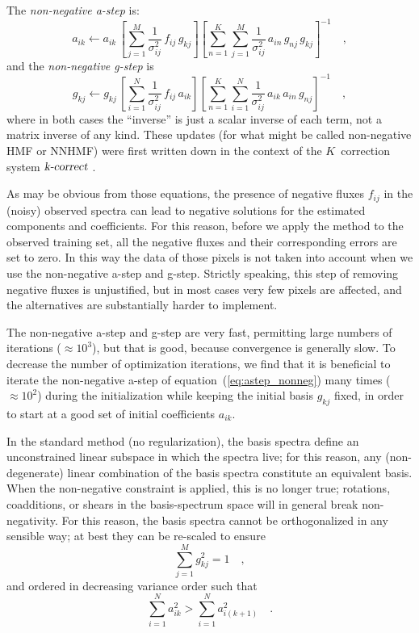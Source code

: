 \documentclass[12pt,preprint]{aastex}
\newcommand{\equationname}{equation}
\begin{document}
The \emph{non-negative a-step} is:
\begin{equation}\label{eq:astep_nonneg}
a_{ik} \gets a_{ik}\,\left[\sum_{j=1}^{M}\frac{1}{\sigma^2_{ij}}\,f_{ij}\,g_{kj}\right]\left[\sum_{n=1}^{K}\sum_{j=1}^{M}\frac{1}{\sigma^2_{ij}}\,a_{in}\,g_{nj}\,g_{kj}\right]^{-1}
\quad ,
\end{equation}
and the \emph{non-negative g-step} is
\begin{equation}\label{eq:gstep_nonneg}
g_{kj} \gets g_{kj}\,\left[\sum_{i=1}^{N}\frac{1}{\sigma^2_{ij}}\,f_{ij}\,a_{ik}\right]\left[\sum_{n=1}^{K}\sum_{i=1}^{N}\frac{1}{\sigma^2_{ij}}\,a_{ik}\,a_{in}\,g_{nj}\right]^{-1}
\quad ,
\end{equation}
where in both cases the ``inverse'' is just a scalar inverse of each
term, not a matrix inverse of any kind.  These updates (for what might
be called non-negative HMF or NNHMF) were first written down in the
context of the $K$~correction system $\textsl{k-correct}$
\citep{blanton}.

As may be obvious from those equations, the presence of negative
fluxes $f_{ij}$ in the (noisy) observed spectra can lead to negative
solutions for the estimated components and coefficients. For this
reason, before we apply the method to the observed training set, all
the negative fluxes and their corresponding errors are set to zero. In
this way the data of those pixels is not taken into account when we
use the non-negative a-step and g-step.  Strictly speaking, this step
of removing negative fluxes is unjustified, but in most cases very few
pixels are affected, and the alternatives are substantially harder to
implement.

The non-negative a-step and g-step are very fast, permitting large
numbers of iterations ($\approx 10^3$), but that is good, because
convergence is generally slow.  To decrease the number of optimization
iterations, we find that it is beneficial to iterate the non-negative
a-step of \equationname~(\ref{eq:astep_nonneg}) many times ($\approx
10^2$) during the initialization while keeping the initial basis
$g_{kj}$ fixed, in order to start at a good set of initial
coefficients $a_{ik}$.

In the standard method (no regularization), the basis spectra define
an unconstrained linear subspace in which the spectra live; for this
reason, any (non-degenerate) linear combination of the basis spectra
constitute an equivalent basis.  When the non-negative constraint is
applied, this is no longer true; rotations, coadditions, or shears in
the basis-spectrum space will in general break non-negativity.  For
this reason, the basis spectra cannot be orthogonalized in any
sensible way; at best they can be re-scaled to ensure
\begin{equation}\label{eq:nnnormalization}
\sum_{j=1}^{M}g_{kj}^2 = 1
\quad ,
\end{equation}
and ordered in decreasing variance order such that
\begin{equation}\label{eq:nnordering}
\sum_{i=1}^{N}a_{ik}^2>\sum_{i=1}^{N}a_{i(k+1)}^2
\quad .
\end{equation}
\end{document}
